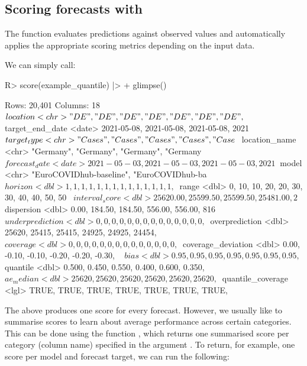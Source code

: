 \documentclass[
]{jss}
\begin{document}
\subsection[Scoring forecasts with score()]{Scoring forecasts with
}\label{scoring}

The function  evaluates predictions against observed
values and automatically applies the appropriate scoring metrics
depending on the input data.

We can simply call:

\begin{CodeChunk}
\begin{CodeInput}
R> score(example_quantile) |>
+   glimpse()
\end{CodeInput}
\begin{CodeOutput}
Rows: 20,401
Columns: 18
$ location           <chr> "DE", "DE", "DE", "DE", "DE", "DE", "DE",~
$ target_end_date    <date> 2021-05-08, 2021-05-08, 2021-05-08, 2021~
$ target_type        <chr> "Cases", "Cases", "Cases", "Cases", "Case~
$ location_name      <chr> "Germany", "Germany", "Germany", "Germany~
$ forecast_date      <date> 2021-05-03, 2021-05-03, 2021-05-03, 2021~
$ model              <chr> "EuroCOVIDhub-baseline", "EuroCOVIDhub-ba~
$ horizon            <dbl> 1, 1, 1, 1, 1, 1, 1, 1, 1, 1, 1, 1, 1, 1,~
$ range              <dbl> 0, 10, 10, 20, 20, 30, 30, 40, 40, 50, 50~
$ interval_score     <dbl> 25620.00, 25599.50, 25599.50, 25481.00, 2~
$ dispersion         <dbl> 0.00, 184.50, 184.50, 556.00, 556.00, 816~
$ underprediction    <dbl> 0, 0, 0, 0, 0, 0, 0, 0, 0, 0, 0, 0, 0, 0,~
$ overprediction     <dbl> 25620, 25415, 25415, 24925, 24925, 24454,~
$ coverage           <dbl> 0, 0, 0, 0, 0, 0, 0, 0, 0, 0, 0, 0, 0, 0,~
$ coverage_deviation <dbl> 0.00, -0.10, -0.10, -0.20, -0.20, -0.30, ~
$ bias               <dbl> 0.95, 0.95, 0.95, 0.95, 0.95, 0.95, 0.95,~
$ quantile           <dbl> 0.500, 0.450, 0.550, 0.400, 0.600, 0.350,~
$ ae_median          <dbl> 25620, 25620, 25620, 25620, 25620, 25620,~
$ quantile_coverage  <lgl> TRUE, TRUE, TRUE, TRUE, TRUE, TRUE, TRUE,~
\end{CodeOutput}
\end{CodeChunk}

The above produces one score for every forecast. However, we usually
like to summarise scores to learn about average performance across
certain categories. This can be done using the function
, which returns one summarised score per
category (column name) specified in the argument . To return,
for example, one score per model and forecast target, we can run the
following:
\end{document}
